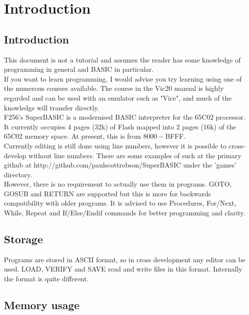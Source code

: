 \chapter{Introduction}

\section{Introduction}

This document is not a tutorial and assumes the reader has some knowledge of programming in general and BASIC in particular. \\

If you want to learn programming, I would advise you try learning using one of the numerous courses available. The course in the Vic20 manual is highly regarded and can be used with an emulator such as "Vice", and much of the knowledge will transfer directly.\\

F256's SuperBASIC is a modernised BASIC interpreter for the 65C02 processor. It currently occupies 4 pages (32k) of Flash mapped into 2 pages (16k) of the 65C02 memory space. At present, this is from $8000-$BFFF.\\

Currently editing is still done using line numbers, however it is possible to cross-develop without line numbers. There are some examples of such at the primary github at http://github.com/paulscottrobson/SuperBASIC under the 'games' directory.\\

However, there is no requirement to actually use them in programs. GOTO, GOSUB and RETURN are supported but this is more for backwards compatibility with older programs. It is advised to use Procedures, For/Next, While, Repeat and If/Else/Endif commands for better programming and clarity.\\

\section{Storage}

Programs are stored in ASCII format, so in cross development any editor can be used. LOAD, VERIFY and SAVE read and write files in this format. Internally the format is quite different.

\section{Memory usage}


